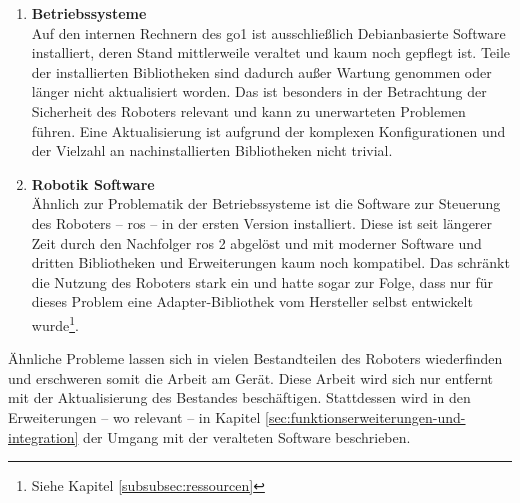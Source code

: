\begin{enumerate}
    \item \textbf{Betriebssysteme}\\
    Auf den internen Rechnern des \gls{go1} ist ausschließlich Debianbasierte Software installiert, deren Stand mittlerweile
    veraltet und kaum noch gepflegt ist.
    Teile der installierten Bibliotheken sind dadurch außer Wartung genommen oder länger nicht aktualisiert worden.
    Das ist besonders in der Betrachtung der Sicherheit des Roboters relevant und kann zu unerwarteten Problemen führen.
    Eine Aktualisierung ist aufgrund der komplexen Konfigurationen und der Vielzahl an nachinstallierten Bibliotheken nicht trivial.
    \item \textbf{Robotik Software}\\
    Ähnlich zur Problematik der Betriebssysteme ist die Software zur Steuerung des Roboters -- \gls{ros} -- in der ersten
    Version installiert.
    Diese ist seit längerer Zeit durch den Nachfolger \gls{ros} \num{2} abgelöst und mit moderner Software und dritten
    Bibliotheken und Erweiterungen kaum noch kompatibel.
    Das schränkt die Nutzung des Roboters stark ein und hatte sogar zur Folge, dass nur für dieses Problem eine Adapter-Bibliothek
    vom Hersteller selbst entwickelt wurde\footnote{Siehe Kapitel \ref{subsubsec:ressourcen}}.
\end{enumerate}

Ähnliche Probleme lassen sich in vielen Bestandteilen des Roboters wiederfinden und erschweren somit die Arbeit am
Gerät.
Diese Arbeit wird sich nur entfernt mit der Aktualisierung des Bestandes beschäftigen.
Stattdessen wird in den Erweiterungen -- wo relevant -- in Kapitel \ref{sec:funktionserweiterungen-und-integration} der Umgang mit der veralteten Software beschrieben.




